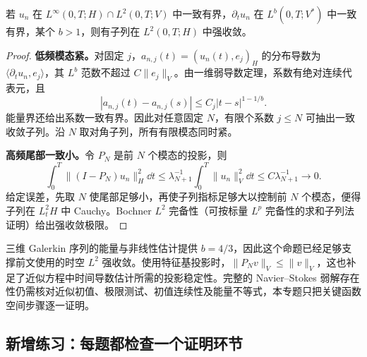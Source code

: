\begin{proposition}[能量界加时间导数界推出强紧性]\label{prop:sobolev-time-compact}
若 $u_n$ 在 $L^\infty(0,T;H)\cap L^2(0,T;V)$ 中一致有界，$\partial_tu_n$ 在 $L^b(0,T;V^*)$ 中一致有界，某个 $b>1$，则有子列在 $L^2(0,T;H)$ 中强收敛。
\end{proposition}
\begin{proof}
\textbf{低频模态紧。}对固定 $j$，$a_{n,j}(t)=(u_n(t),e_j)_H$ 的分布导数为 $\langle\partial_tu_n,e_j\rangle$，其 $L^b$ 范数不超过 $C\|e_j\|_V$。由一维弱导数定理，系数有绝对连续代表元，且
\[
 |a_{n,j}(t)-a_{n,j}(s)|\le C_j|t-s|^{1-1/b}.
\]
能量界还给出系数一致有界。因此对任意固定 $N$，有限个系数 $j\le N$ 可抽出一致收敛子列。沿 $N$ 取对角子列，所有有限模态同时紧。

\textbf{高频尾部一致小。}令 $P_N$ 是前 $N$ 个模态的投影，则
\[
 \int_0^T\|(I-P_N)u_n\|_H^2\dd t
 \le\lambda_{N+1}^{-1}\int_0^T\|u_n\|_V^2\dd t
 \le C\lambda_{N+1}^{-1}\longrightarrow0.
\]
给定误差，先取 $N$ 使尾部足够小，再使子列指标足够大以控制前 $N$ 个模态，便得子列在 $L^2_tH$ 中 Cauchy。Bochner $L^2$ 完备性（可按标量 $L^p$ 完备性的求和子列法证明）给出强收敛极限。
\end{proof}

三维 Galerkin 序列的能量与非线性估计提供 $b=4/3$，因此这个命题已经足够支撑前文使用的时空 $L^2$ 强收敛。使用特征基投影时，$\|P_Nv\|_V\le\|v\|_V$，这也补足了近似方程中时间导数估计所需的投影稳定性。完整的 Navier--Stokes 弱解存在性仍需核对近似初值、极限测试、初值连续性及能量不等式，本专题只把关键函数空间步骤逐一证明。

\subsection{新增练习：每题都检查一个证明环节}


